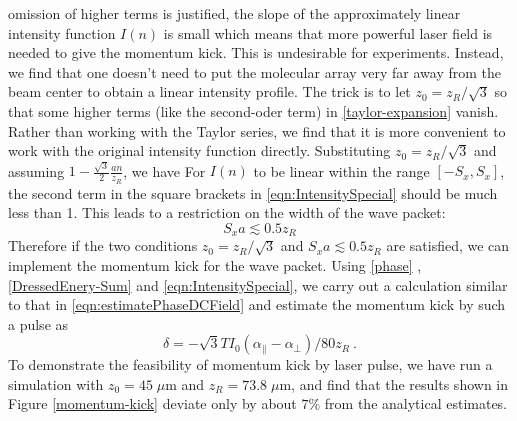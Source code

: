  omission of higher terms is justified, the slope of the approximately linear intensity function $I(n)$ is small which
 means that more powerful laser field is needed to give the momentum kick. This is undesirable for experiments.
Instead, we find that one doesn’t need to put the molecular array very far away from the beam center
to obtain a linear intensity profile. The trick is to let $z_0 = z_R /\sqrt{3}$ so that some higher terms (like the 
second-oder term) in \autoref{taylor-expansion} vanish. Rather than working with the
Taylor series, we find that it is more convenient to work with the original intensity function directly. Substituting
$z_0 = z_R /\sqrt{3}$ and assuming $1 - \frac{\sqrt{3}}{2} \frac{a n}{z_R}$, we have
For $I(n)$ to be linear within the range $[ - S_x , S_x ]$, the second term in the square brackets in
 \autoref{eqn:IntensitySpecial} should be much less than 1.
This leads to a restriction on the width of the wave packet:
\begin{equation}
S_x a\lesssim 0.5 z_R
\end{equation}
Therefore if the two conditions $z_0 = z_R/\sqrt{3}$ and $S_x
a\lesssim 0.5 z_R$ are satisfied, we can implement the momentum
kick for the wave packet. Using \autoref{phase} ,
\autoref{DressedEnery-Sum} and \autoref{eqn:IntensitySpecial}, we carry out a calculation similar to that in
 \autoref{eqn:estimatePhaseDCField} and estimate the momentum kick by such a pulse as 
\begin{equation}
\delta = -\sqrt{3}T I_{0} (\alpha_{\|}-\alpha_\perp) / 80 z_R \ . \label{Kick-AC}
\end{equation}
To demonstrate the feasibility of momentum kick by laser
pulse, we have run a simulation with $z_0 = 45\; \mu$m and
$z_R=73.8\; \mu$m, and find that the results shown in Figure
\ref{momentum-kick} deviate only by about $7\%$ from the
analytical estimates.



